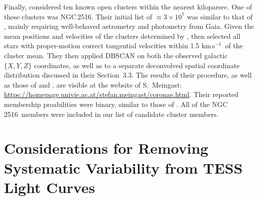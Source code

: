 \documentclass[12pt,twocolumn,tighten]{aastex63}
\newcommand{\cn}{NGC\,2516} %
\newcommand{\kms}{\,km\,s$^{-1}$}
\begin{document}
Finally,  considered ten known open clusters
within the nearest kiloparsec. One of these clusters was \cn.  Their
initial  list of $\approx$$3\times10^7$ was similar to that of
, mainly requiring well-behaved
astrometry and photometry from Gaia.  Given the mean positions and
velocities of the clusters determined by
,  then
selected all stars with proper-motion correct tangential velocities
within 1.5\,\kms\ of the cluster mean.  They then applied DBSCAN
\citep{ester_density-based_1996} on both the observed galactic
$\{X,Y,Z\}$ coordinates, as well as to a separate deconvolved spatial
coordinate distribution discussed in their Section~3.3.  The results
of their procedure, as well as those of
 and
, are visible at the website of
S.~Meingast:
\url{https://homepage.univie.ac.at/stefan.meingast/coronae.html}.
Their reported membership proabilities were binary, similar to those
of .  All of the
 \cn\ members were included in our list of
candidate cluster members.




\section{Considerations for Removing Systematic Variability from TESS Light Curves}
\label{app:detrending}
\end{document}
